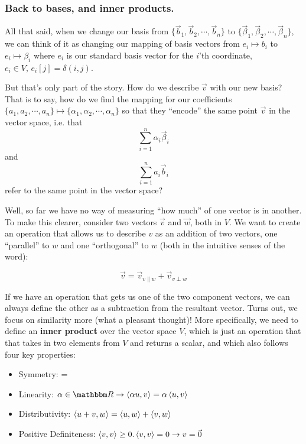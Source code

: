 \documentclass[letterpaper,12pt]{report}
\providecommand{\tightlist}{%
  \setlength{\itemsep}{0pt}\setlength{\parskip}{0pt}}
\begin{document}
\subsubsection*{Back to bases, and inner products.}

All that said, when we change our basis from
\(\{\vec{b}_1, \vec{b}_2, \cdots, \vec{b}_n\}\)
to 
\(\{\vec{\beta}_1, \vec{\beta}_2, \cdots, \vec{\beta}_n\}\),
we can think of it as changing our mapping of basis vectors from 
\(e_i \mapsto b_i\)
to
\(e_i \mapsto \beta_i\)
where \(e_i\) is our standard basis vector for the \(i\)'th coordinate, 
\(e_i \in V, \, e_i[j] = \delta(i,j)\).
\par

But that's only part of the story. How do we describe \(\vec{v}\)
with our new basis? That is to say, how do we find the mapping for our coefficients
\(\{a_1, a_2, \cdots, a_n\} \mapsto \{\alpha_1, \alpha_2, \cdots, \alpha_n\}\)
so that they ``encode'' the same point \(\vec{v}\) in the vector space, i.e. that
\[\sum_{i=1}^{n}\alpha_i\vec{\beta}_i \]
and
\[\sum_{i=1}^{n}a_i\vec{b}_i\]
refer to the same point in the vector space?\par

Well, so far we have no way of measuring ``how much'' of one vector is in another.
To make this clearer, consider two vectors \(\vec{v}\) and \(\vec{w}\), both in \(V\).
We want to create an operation that allows us to describe \(v\) as an addition of two vectors,
one ``parallel'' to \(w\) and one ``orthogonal'' to \(w\)
(both in the intuitive senses of the word):

\[\vec{v} = \vec{v}_{v\parallel w} + \vec{v}_{v\perp w}\]
 

If we have an operation that gets us one of the two component vectors, we can
always define the other as a subtraction from the resultant vector.
Turns out, we focus on similarity more (what a pleasant thought)!
More specifically, we need to 
define an \textbf{inner product} \innerprod{} over the vector space \(V\),
which is just an operation that that takes in two elements from \(V\) and returns a scalar,
and which also follows four key properties:
\begin{itemize}
  \tightlist
  \item
    Symmetry:  = 
  \item
    Linearity: \(\alpha \in \domain{R} 
          \rightarrow \innerprod{\alpha u}{v} = \alpha \innerprod{u}{v}\)
  \item
    Distributivity:
      \(\left<u+v,w\right> = \left<u,w\right> + \left<v,w\right>\)
  \item
    Positive Definiteness:
      \(\left<v,v\right> \geq 0. \left<v,v\right> = 0 \rightarrow v = \vec{0}\)
\end{itemize}
\end{document}
